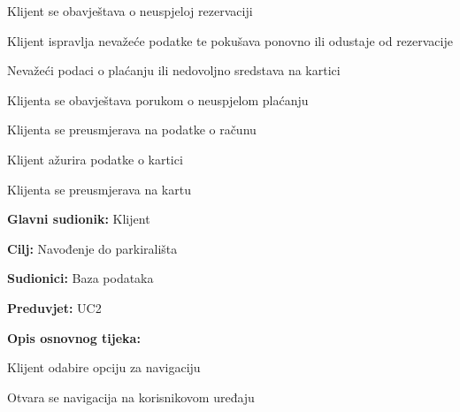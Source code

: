 \begin{packed_item}
\begin{packed_item}
\begin{packed_enum}
			\item Klijent se obavještava o neuspjeloj rezervaciji
			\item Klijent ispravlja nevažeće podatke te pokušava ponovno ili odustaje od rezervacije
			
		\end{packed_enum}
		
		\item[5.a] Nevažeći podaci o plaćanju ili nedovoljno sredstava na kartici
		\item[] \begin{packed_enum}
			
			\item Klijenta se obavještava porukom o neuspjelom plaćanju
			\item Klijenta se preusmjerava na podatke o računu
			\item Klijent ažurira podatke o kartici
			\item Klijenta se preusmjerava na kartu
			
		\end{packed_enum}
		
	\end{packed_item}
		
\end{packed_item}

\pagebreak

\noindent {}
\begin{packed_item}
	
	\item \textbf{Glavni sudionik:} Klijent
	\item  \textbf{Cilj:} Navođenje do parkirališta
	\item  \textbf{Sudionici:} Baza podataka
	\item  \textbf{Preduvjet:} UC2
	\item  \textbf{Opis osnovnog tijeka:}
	
	\item[] \begin{packed_enum}
		
		\item Klijent odabire opciju za navigaciju
		\item Otvara se navigacija na korisnikovom uređaju
		
	\end{packed_enum}
\end{packed_item}

